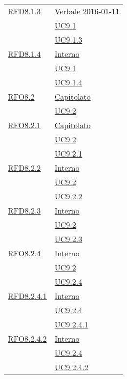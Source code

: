 \begin{longtable}{|>{\centering}m{5cm}|m{5cm}<{\centering}|}
\hyperlink{RFD8.1.3}{RFD8.1.3} & \hyperlink{Verbale 2016-01-11}{Verbale 2016-01-11}\\
& \hyperref[UC9.1]{UC9.1}\\
& \hyperref[UC9.1.3]{UC9.1.3}\\ \hline

\hyperlink{RFD8.1.4}{RFD8.1.4} & \hyperlink{Interno}{Interno}\\
& \hyperref[UC9.1]{UC9.1}\\
& \hyperref[UC9.1.4]{UC9.1.4}\\ \hline

\hyperlink{RFO8.2}{RFO8.2} & \hyperlink{Capitolato}{Capitolato}\\
& \hyperref[UC9.2]{UC9.2}\\ \hline

\hyperlink{RFO8.2.1}{RFO8.2.1} & \hyperlink{Capitolato}{Capitolato}\\
& \hyperref[UC9.2]{UC9.2}\\
& \hyperref[UC9.2.1]{UC9.2.1}\\ \hline

\hyperlink{RFD8.2.2}{RFD8.2.2} & \hyperlink{Interno}{Interno}\\
& \hyperref[UC9.2]{UC9.2}\\
& \hyperref[UC9.2.2]{UC9.2.2}\\ \hline

\hyperlink{RFD8.2.3}{RFD8.2.3} & \hyperlink{Interno}{Interno}\\
& \hyperref[UC9.2]{UC9.2}\\
& \hyperref[UC9.2.3]{UC9.2.3}\\ \hline

\hyperlink{RFO8.2.4}{RFO8.2.4} & \hyperlink{Interno}{Interno}\\
& \hyperref[UC9.2]{UC9.2}\\
& \hyperref[UC9.2.4]{UC9.2.4}\\ \hline

\hyperlink{RFD8.2.4.1}{RFD8.2.4.1} & \hyperlink{Interno}{Interno}\\
& \hyperref[UC9.2.4]{UC9.2.4}\\
& \hyperref[UC9.2.4.1]{UC9.2.4.1}\\ \hline

\hyperlink{RFO8.2.4.2}{RFO8.2.4.2} & \hyperlink{Interno}{Interno}\\
& \hyperref[UC9.2.4]{UC9.2.4}\\
& \hyperref[UC9.2.4.2]{UC9.2.4.2}\\ \hline


\end{longtable}
